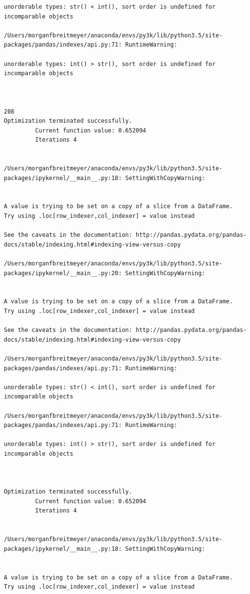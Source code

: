 \begin{lstlisting}
unorderable types: str() < int(), sort order is undefined for incomparable objects

/Users/morganfbreitmeyer/anaconda/envs/py3k/lib/python3.5/site-packages/pandas/indexes/api.py:71: RuntimeWarning:

unorderable types: int() > str(), sort order is undefined for incomparable objects



208
Optimization terminated successfully.
         Current function value: 0.652094
         Iterations 4


/Users/morganfbreitmeyer/anaconda/envs/py3k/lib/python3.5/site-packages/ipykernel/__main__.py:18: SettingWithCopyWarning:


A value is trying to be set on a copy of a slice from a DataFrame.
Try using .loc[row_indexer,col_indexer] = value instead

See the caveats in the documentation: http://pandas.pydata.org/pandas-docs/stable/indexing.html#indexing-view-versus-copy

/Users/morganfbreitmeyer/anaconda/envs/py3k/lib/python3.5/site-packages/ipykernel/__main__.py:20: SettingWithCopyWarning:


A value is trying to be set on a copy of a slice from a DataFrame.
Try using .loc[row_indexer,col_indexer] = value instead

See the caveats in the documentation: http://pandas.pydata.org/pandas-docs/stable/indexing.html#indexing-view-versus-copy

/Users/morganfbreitmeyer/anaconda/envs/py3k/lib/python3.5/site-packages/pandas/indexes/api.py:71: RuntimeWarning:

unorderable types: str() < int(), sort order is undefined for incomparable objects

/Users/morganfbreitmeyer/anaconda/envs/py3k/lib/python3.5/site-packages/pandas/indexes/api.py:71: RuntimeWarning:

unorderable types: int() > str(), sort order is undefined for incomparable objects



Optimization terminated successfully.
         Current function value: 0.652094
         Iterations 4


/Users/morganfbreitmeyer/anaconda/envs/py3k/lib/python3.5/site-packages/ipykernel/__main__.py:18: SettingWithCopyWarning:


A value is trying to be set on a copy of a slice from a DataFrame.
Try using .loc[row_indexer,col_indexer] = value instead


\end{lstlisting}
